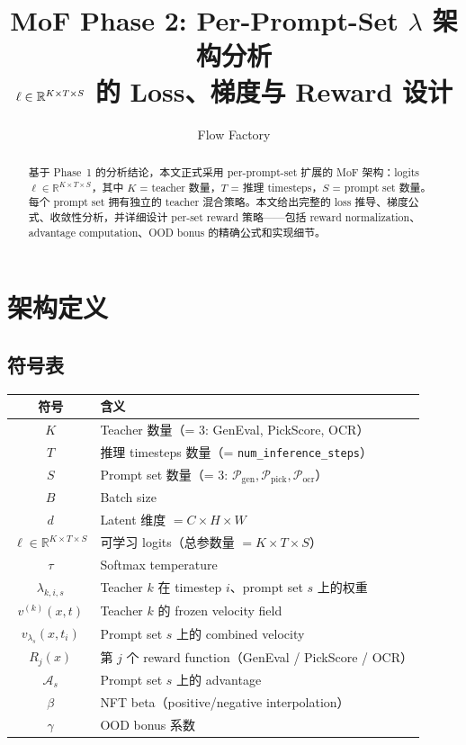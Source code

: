 \documentclass[11pt,a4paper]{article}
\title{\textbf{MoF Phase 2: Per-Prompt-Set $\lambda$ 架构分析}\\[0.3em]
\large $\ell \in \R^{K \times T \times S}$ 的 Loss、梯度与 Reward 设计}
\author{Flow Factory}
\date{}
\newcommand{\R}{\mathbb{R}}
\newcommand{\adv}{\mathcal{A}}
\theoremstyle{definition}
\begin{document}
\maketitle

\begin{abstract}
基于 Phase~1 的分析结论，本文正式采用 per-prompt-set 扩展的 MoF 架构：logits $\ell \in \R^{K \times T \times S}$，其中 $K$ = teacher 数量，$T$ = 推理 timesteps，$S$ = prompt set 数量。每个 prompt set 拥有独立的 teacher 混合策略。本文给出完整的 loss 推导、梯度公式、收敛性分析，并详细设计 per-set reward 策略——包括 reward normalization、advantage computation、OOD bonus 的精确公式和实现细节。
\end{abstract}

\tableofcontents
\newpage

\section{架构定义}
\label{sec:architecture}

\subsection{符号表}

\begin{center}
\renewcommand{\arraystretch}{1.3}
\begin{tabular}{cl}
\toprule
\textbf{符号} & \textbf{含义} \\
\midrule
$K$ & Teacher 数量（= 3: GenEval, PickScore, OCR） \\
$T$ & 推理 timesteps 数量（= \texttt{num\_inference\_steps}） \\
$S$ & Prompt set 数量（= 3: $\mathcal{P}_{\mathrm{gen}}, \mathcal{P}_{\mathrm{pick}}, \mathcal{P}_{\mathrm{ocr}}$） \\
$B$ & Batch size \\
$d$ & Latent 维度 $= C \times H \times W$ \\
$\ell \in \R^{K \times T \times S}$ & 可学习 logits（总参数量 $= K \times T \times S$） \\
$\tau$ & Softmax temperature \\
$\lambda_{k,i,s}$ & Teacher $k$ 在 timestep $i$、prompt set $s$ 上的权重 \\
$v^{(k)}(x, t)$ & Teacher $k$ 的 frozen velocity field \\
$v_{\lambda_s}(x, t_i)$ & Prompt set $s$ 上的 combined velocity \\
$R_j(x)$ & 第 $j$ 个 reward function（GenEval / PickScore / OCR） \\
$\adv_s$ & Prompt set $s$ 上的 advantage \\
$\beta$ & NFT beta（positive/negative interpolation） \\
$\gamma$ & OOD bonus 系数 \\
\bottomrule
\end{tabular}
\end{center}
\end{document}
